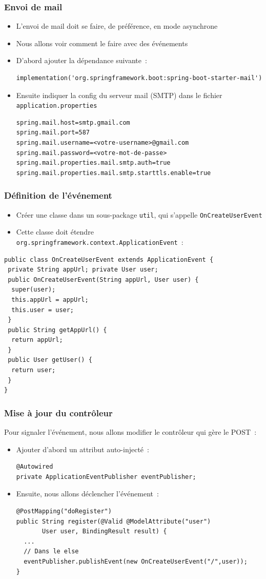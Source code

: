 \documentclass{beamer}
\begin{document}
\begin{frame}[fragile]
	\frametitle{Envoi de mail}
	\begin{itemize}
		\item L'envoi de mail doit se faire, de préférence, en mode asynchrone
		\item Nous allons voir comment le faire avec des événements
		\item D'abord ajouter la dépendance suivante~:
\begin{lstlisting}
implementation('org.springframework.boot:spring-boot-starter-mail')
\end{lstlisting}		
\item Ensuite indiquer la config du serveur mail (SMTP) dans le fichier \texttt{application.properties}
\begin{lstlisting}
spring.mail.host=smtp.gmail.com
spring.mail.port=587
spring.mail.username=<votre-username>@gmail.com
spring.mail.password=<votre-mot-de-passe>
spring.mail.properties.mail.smtp.auth=true
spring.mail.properties.mail.smtp.starttls.enable=true
\end{lstlisting}
	\end{itemize}
\end{frame}

\begin{frame}[fragile]
	\frametitle{Définition de l'événement}
	\begin{itemize}
		\item Créer une classe dans un sous-package \texttt{util}, qui s'appelle \texttt{OnCreateUserEvent}
		\item Cette classe doit étendre \texttt{org.springframework.context.ApplicationEvent}~:
	\end{itemize}
\begin{lstlisting}
public class OnCreateUserEvent extends ApplicationEvent {
 private String appUrl; private User user;
 public OnCreateUserEvent(String appUrl, User user) {
  super(user);
  this.appUrl = appUrl;
  this.user = user;
 }
 public String getAppUrl() {
  return appUrl;
 }
 public User getUser() {
  return user;
 }
}
\end{lstlisting}
\end{frame}

\begin{frame}[fragile]
	\frametitle{Mise à jour du contrôleur}
	Pour signaler l'événement, nous allons modifier le contrôleur qui gère le POST~:
	\begin{itemize}
		\item Ajouter d'abord un attribut auto-injecté~:
\begin{lstlisting}
@Autowired
private ApplicationEventPublisher eventPublisher;
\end{lstlisting}
\item Ensuite, nous allons déclencher l'événement~:
\begin{lstlisting}
@PostMapping("doRegister")
public String register(@Valid @ModelAttribute("user")
       User user, BindingResult result) {
  ...
  // Dans le else
  eventPublisher.publishEvent(new OnCreateUserEvent("/",user));
}
\end{lstlisting}
	\end{itemize}
\end{frame}
\end{document}
